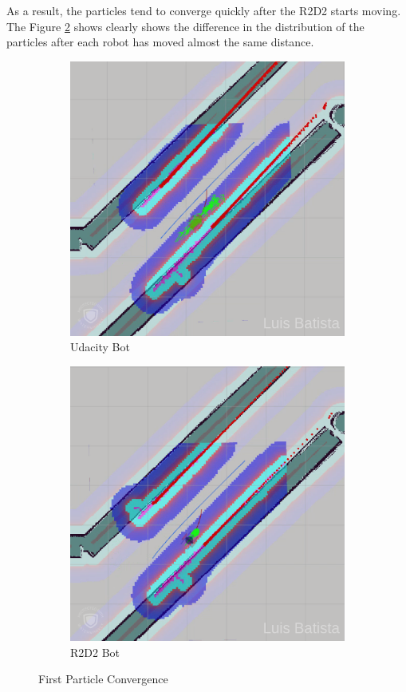 \documentclass[10pt,journal,compsoc]{IEEEtran}
\begin{document}
As a result, the particles tend to converge quickly after the R2D2 starts moving. The Figure \ref{fig:r2d2-2} shows clearly shows the difference in the distribution of the particles after each robot has moved almost the same distance. 

\begin{figure}[H]
\centering
\begin{subfigure}{.5\linewidth}
  \centering
  \includegraphics[width=.95\linewidth]{ub_2.png}
  \caption{Udacity Bot}
  \label{fig:ub-2}
\end{subfigure}%
\begin{subfigure}{.5\linewidth}
  \centering
  \includegraphics[width=.95\linewidth]{r2d2_2.png}
  \caption{R2D2 Bot}
  \label{fig:r2d2-2}
\end{subfigure}
\caption{First Particle Convergence}
\label{fig:conv1}
\end{figure}
\end{document}
